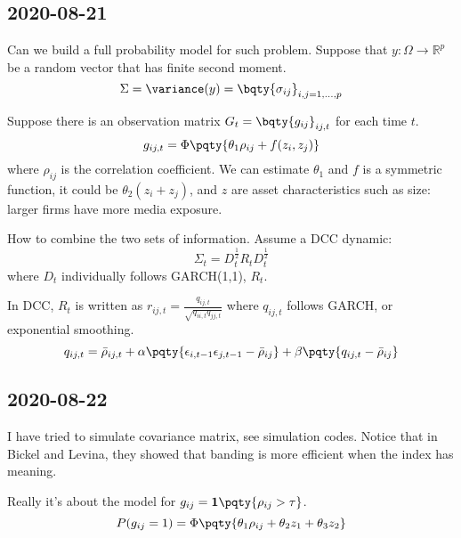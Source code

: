 \subsection{2020-08-21}
Can we build a full probability model for such problem. Suppose that \(y: {\Omega}\to \mathbb{R}^{p}\) be a random vector that has finite second moment. 
\begin{equation}
    \Sigma = \variance(y) = \bqty{\sigma_{ij}}_{i,j = 1,\dots,p}
\end{equation}

Suppose there is an observation matrix \(G_{t} = \bqty{g_{ij}}_{ij, t}\) for each time \(t\). 
\begin{equation}
    g_{ij,t} = \Phi\pqty{\theta_{1} \rho_{ij} + f(z_{i},z_{j})}
\end{equation}
where \(\rho_{ij}\) is the correlation coefficient. 
We can estimate \(\theta_{1}\) and \(f\) is a symmetric function, it could be \(\theta_{2} (z_{i} + z_{j})\), and \(z\) are asset characteristics such as size: larger firms have more media exposure. 

How to combine the two sets of information. Assume a DCC dynamic:
\begin{equation}
    \Sigma_{t} = D_{t}^{\frac{1}{2}} R_{t} D_{t}^{\frac{1}{2}}
\end{equation}
where \(D_{t}\) individually follows GARCH(1,1), \(R_{t}\). 

In DCC, \(R_{t}\) is written as \(r_{ij,t} = \frac{q_{ij,t}}{\sqrt{q_{ii,t} q_{jj,t}}}\) where \(q_{ij,t}\) follows GARCH, or exponential smoothing. 
\begin{equation}
    q_{ij,t} = \bar{\rho}_{ij,t} + \alpha \pqty{\epsilon_{i,t-1} \epsilon_{j,t-1} - \bar{\rho}_{ij}} + \beta \pqty{q_{ij,t} - \bar{\rho}_{ij}} 
\end{equation}

\subsection{2020-08-22}
I have tried to simulate covariance matrix, see simulation codes. Notice that in Bickel and Levina, they showed that banding is more efficient when the index has meaning.

Really it's about the model for \(g_{ij} = \mathbf{1}\pqty{\rho_{ij} > \tau}\). 
\begin{equation}
    P(g_{ij} = 1) = \Phi\pqty{\theta_{1}\rho_{ij} + \theta_{2} z_{1} + \theta_{3}z_{2}}
\end{equation}

